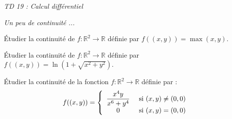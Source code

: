 \documentclass[a4paper,10pt]{report}
\begin{document}
\everymath{\displaystyle}

\begin{center}
\textit{{ {\huge TD 19 : Calcul différentiel}}}
\end{center}

\medskip

\medskip

\begin{center}
\textit{{ {\large Un peu de continuité ...}}}
\end{center}

\medskip


\begin{Exercice}{} Étudier la continuité de $f : \mathbb{R}^2 \rightarrow \mathbb{R}$ définie par $ f((x,y))=  \max(x,y)$.
\end{Exercice}


\begin{Exercice}{} Étudier la continuité de $f : \mathbb{R}^2 \rightarrow \mathbb{R}$ définie par $f((x,y))= \ln(1 + \sqrt{x^2+y^2})$.
\end{Exercice}


\begin{Exercice}{} Étudier la continuité de la fonction $f : \mathbb{R}^2 \rightarrow \mathbb{R}$ définie par :
$$ f((x,y)) = \left\lbrace \begin{array}{cl}
\dfrac{x^4 y}{x^6+y^4} & \hbox{ si } (x,y) \neq (0,0) \\
0 & \hbox{ si } (x,y)=(0,0) \\
\end{array}\right.$$
\end{Exercice}

%
%
\end{document}
